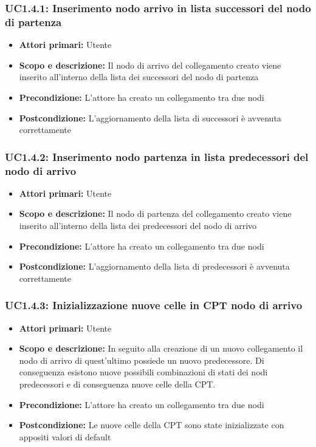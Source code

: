 \subsubsection{UC1.4.1: Inserimento nodo arrivo in lista successori del nodo di partenza} 
\begin{itemize} 
	\item{\textbf{Attori primari:} Utente} 
	\item{\textbf{Scopo e descrizione:} Il nodo di arrivo del collegamento creato viene inserito all'interno della lista dei successori del nodo di partenza} 
	\item{\textbf{Precondizione:} L'attore ha creato un collegamento tra due nodi} 
	\item{\textbf{Postcondizione:} L'aggiornamento della lista di successori è avvenuta correttamente} 
\end{itemize} 
\subsubsection{UC1.4.2: Inserimento nodo partenza in lista predecessori del nodo di arrivo} 
\begin{itemize} 
	\item{\textbf{Attori primari:} Utente} 
	\item{\textbf{Scopo e descrizione:} Il nodo di partenza del collegamento creato viene inserito all'interno della lista dei predecessori del nodo di arrivo} 
	\item{\textbf{Precondizione:} L'attore ha creato un collegamento tra due nodi} 
	\item{\textbf{Postcondizione:} L'aggiornamento della lista di predecessori è avvenuta correttamente} 
\end{itemize} 
\subsubsection{UC1.4.3: Inizializzazione nuove celle in CPT nodo di arrivo} 
\begin{itemize} 
	\item{\textbf{Attori primari:} Utente} 
	\item{\textbf{Scopo e descrizione:} In seguito alla creazione di un nuovo collegamento il nodo di arrivo di quest'ultimo possiede un nuovo predecessore. Di conseguenza esistono nuove possibili combinazioni di stati dei nodi predecessori e di conseguenza nuove celle della CPT.} 
	\item{\textbf{Precondizione:} L'attore ha creato un collegamento tra due nodi} 
	\item{\textbf{Postcondizione:} Le nuove celle della CPT sono state inizializzate con appositi valori di default} 
\end{itemize} 
